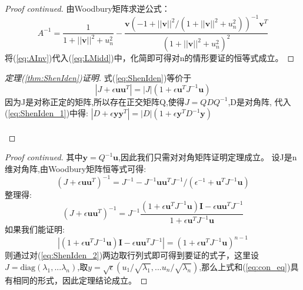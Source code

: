 \begin{proof}[Proof continued]
由Woodbury矩阵求逆公式：
\begin{equation}\label{eq:AInv}
A^{-1}=\frac{1}{1+||\bm{v}||^2+u_n^2}-\frac{\bm{v}(-1+||\bm{v}||^2/(1+||\bm{v}||^2+u_n^2))^{-1}\bm{v}^T}{(1+||\bm{v}||^2+u_n^2)^2}
\end{equation}
将(\ref{eq:AInv})代入(\ref{eq:LMidd})中，化简即可得对n的情形要证的恒等式成立。
\end{proof}
\begin{proof}[定理(\ref{thm:ShenIden})证明]
式(\ref{eq:ShenIden})等价于
\begin{equation}\label{eq:ShenIden_1}
|J+\epsilon \bm{u}\bm{u}^T|=|J|(1+\epsilon \bm{u}^TJ^{-1}\bm{u})
\end{equation}
因为J是对称正定的矩阵,所以存在正交矩阵Q,使得$J=QDQ^{-1}$,D是对角阵,
代入(\ref{eq:ShenIden_1})中得:
$|D+\epsilon \bm{y}\bm{y}^T|=|D|(1+\epsilon \bm{y}^TD^{-1}\bm{y})$
\\
\qquad\\
\end{proof}


\begin{proof}[Proof continued]
其中$\bm{y}=Q^{-1}\bm{u}$,因此我们只需对对角矩阵证明定理成立。
设J是n维对角阵,由Woodbury矩阵恒等式可得:
\begin{equation}
(J+\epsilon \bm{u}\bm{u}^T)^{-1}=J^{-1}-J^{-1}\bm{u}\bm{u}^TJ^{-1}/(\epsilon^{-1}+\bm{u}^TJ^{-1}\bm{u})
\end{equation}
整理得:
\begin{equation}\label{eq:ShenIden_2}
(J+\epsilon \bm{u}\bm{u}^T)^{-1}=J^{-1}\frac{(1+\epsilon\bm{u}^TJ^{-1}\bm{u})\bm{I}-\epsilon \bm{u}\bm{u}^TJ^{-1}}{1+\epsilon\bm{u}^TJ^{-1}\bm{u}}
\end{equation}
如果我们能证明:
\begin{equation}
|(1+\epsilon\bm{u}^TJ^{-1}\bm{u})\bm{I}-\epsilon \bm{u}\bm{u}^TJ^{-1}|=(1+\epsilon\bm{u}^TJ^{-1}\bm{u})^{n-1}
\end{equation}
则通过对(\ref{eq:ShenIden_2})两边取行列式即可得到要证的式子，这里设$J=\text{diag}(\lambda_1,...\lambda_n)$,取$y=\sqrt{\epsilon}(u_1/\sqrt{\lambda_1},...u_n/\sqrt{\lambda_n})$,那么上式和(\ref{eq:con_eq})具有相同的形式，因此定理结论成立。
\end{proof}

